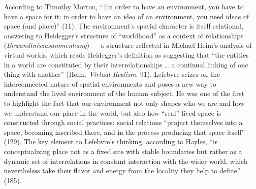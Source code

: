 \documentclass{article}
\begin{document}
According to Timothy Morton, ``[i]n order to have an environment, you have to have a space for it; in order to have an idea of an environment, you need ideas of space (and place)'' (11). The environment's spatial character is itself relational, answering to Heidegger's structure of ``worldhood'' as a context of relationships (\textit{Bewandtniszusammenhang}) — a structure reflected in Michael Heim's analysis of virtual worlds, which reads Heidegger's definition as suggesting that ``the entities in a world are constituted by their interrelationships … a continual linking of one thing with another'' (Heim, \textit{Virtual Realism}, 91). Lefebvre seizes on the interconnected nature of spatial environments and poses a new way to understand the lived environment of the human subject. He was one of the first to highlight the fact that our environment not only shapes who we are and how we understand our place in the world, but also how ``real'' lived space is constructed through social practices: social relations ``project themselves into a space, becoming inscribed there, and in the process producing that space itself'' (129). The key element to Lefebvre's thinking, according to Hayles, ``is conceptualizing place not as a fixed site with stable boundaries but rather as a dynamic set of interrelations in constant interaction with the wider world, which nevertheless take their flavor and energy from the locality they help to define'' (185).
\end{document}

